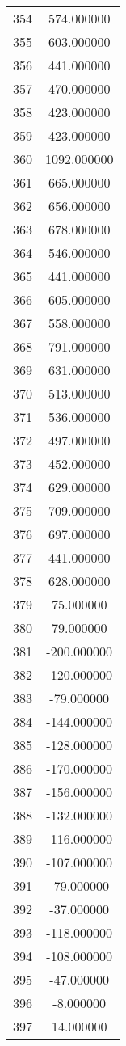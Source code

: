 \documentclass[12pt]{article}
\begin{document}
\begin{longtable}{@{}cc@{}}
354 & 574.000000 \\
355 & 603.000000 \\
356 & 441.000000 \\
357 & 470.000000 \\
358 & 423.000000 \\
359 & 423.000000 \\
360 & 1092.000000 \\
361 & 665.000000 \\
362 & 656.000000 \\
363 & 678.000000 \\
364 & 546.000000 \\
365 & 441.000000 \\
366 & 605.000000 \\
367 & 558.000000 \\
368 & 791.000000 \\
369 & 631.000000 \\
370 & 513.000000 \\
371 & 536.000000 \\
372 & 497.000000 \\
373 & 452.000000 \\
374 & 629.000000 \\
375 & 709.000000 \\
376 & 697.000000 \\
377 & 441.000000 \\
378 & 628.000000 \\
379 & 75.000000 \\
380 & 79.000000 \\
381 & -200.000000 \\
382 & -120.000000 \\
383 & -79.000000 \\
384 & -144.000000 \\
385 & -128.000000 \\
386 & -170.000000 \\
387 & -156.000000 \\
388 & -132.000000 \\
389 & -116.000000 \\
390 & -107.000000 \\
391 & -79.000000 \\
392 & -37.000000 \\
393 & -118.000000 \\
394 & -108.000000 \\
395 & -47.000000 \\
396 & -8.000000 \\
397 & 14.000000 \\

\end{longtable}
\end{document}
